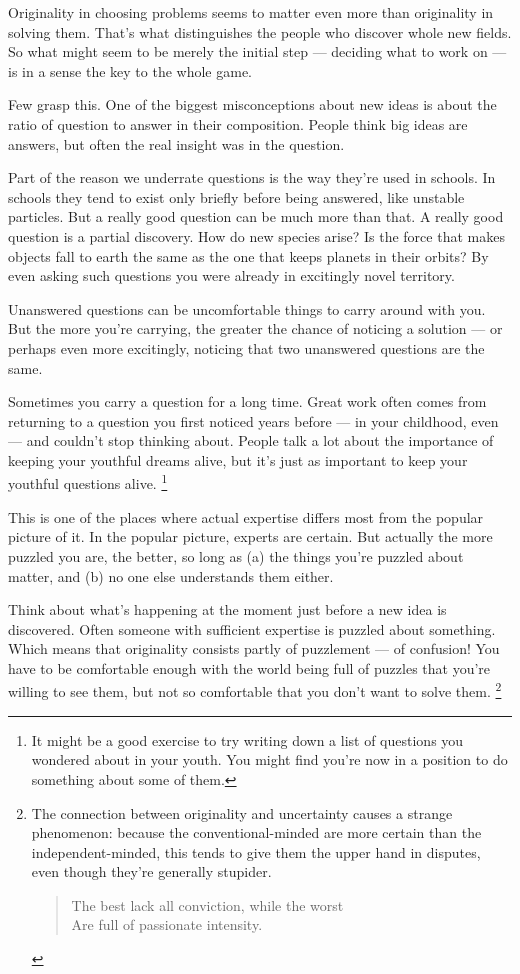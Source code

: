 Originality in choosing problems seems to matter even more than
originality in solving them. That's what distinguishes the people who
discover whole new fields. So what might seem to be merely the initial
step --- deciding what to work on --- is in a sense the key to the whole
game.

Few grasp this. One of the biggest misconceptions about new ideas is
about the ratio of question to answer in their composition. People think
big ideas are answers, but often the real insight was in the question.

Part of the reason we underrate questions is the way they're used in
schools. In schools they tend to exist only briefly before being
answered, like unstable particles. But a really good question can be
much more than that. A really good question is a partial discovery. How
do new species arise? Is the force that makes objects fall to earth the
same as the one that keeps planets in their orbits? By even asking such
questions you were already in excitingly novel territory.

Unanswered questions can be uncomfortable things to carry around with
you. But the more you're carrying, the greater the chance of noticing a
solution --- or perhaps even more excitingly, noticing that two
unanswered questions are the same.

Sometimes you carry a question for a long time. Great work often comes
from returning to a question you first noticed years before --- in your
childhood, even --- and couldn't stop thinking about. People talk a lot
about the importance of keeping your youthful dreams alive, but it's
just as important to keep your youthful questions alive.
\footnote{It might be a good exercise to try writing down a list of
questions you wondered about in your youth. You might find you're now in
a position to do something about some of them.}

This is one of the places where actual expertise differs most from the
popular picture of it. In the popular picture, experts are certain. But
actually the more puzzled you are, the better, so long as (a) the things
you're puzzled about matter, and (b) no one else understands them
either.

Think about what's happening at the moment just before a new idea is
discovered. Often someone with sufficient expertise is puzzled about
something. Which means that originality consists partly of puzzlement
--- of confusion! You have to be comfortable enough with the world being
full of puzzles that you're willing to see them, but not so comfortable
that you don't want to solve them. \footnote{The connection between originality and uncertainty causes a
strange phenomenon: because the conventional-minded are more certain
than the independent-minded, this tends to give them the upper hand in
disputes, even though they're generally stupider.

\begin{quote}
The best lack all conviction, while the worst\\
Are full of passionate intensity.
\end{quote}}

